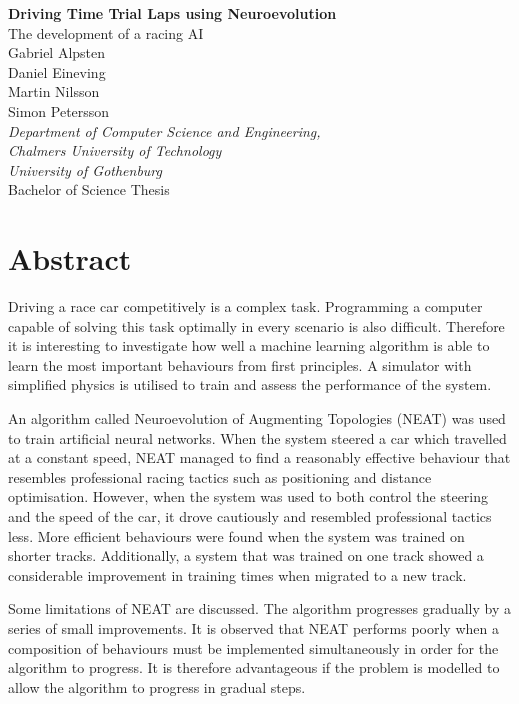 \thispagestyle{plain}			%

\noindent
{\large \textbf{Driving Time Trial Laps using Neuroevolution}}\\
{\large The development of a racing AI}\\

\noindent
{\large Gabriel Alpsten}\\
{\large Daniel Eineving}\\
{\large Martin Nilsson}\\
{\large Simon Petersson}\\
\textit{Department of Computer Science and Engineering,}\\
\textit{Chalmers University of Technology}\\
\textit{University of Gothenburg}\\

\noindent
Bachelor of Science Thesis

\section*{\centering Abstract}

Driving a race car competitively is a complex task. Programming a computer capable of solving this task optimally in every scenario is also difficult. Therefore it is interesting to investigate how well a machine learning algorithm is able to learn the most important behaviours from first principles. A simulator with simplified physics is utilised to train and assess the performance of the system.

An algorithm called Neuroevolution of Augmenting Topologies (NEAT) was used to train artificial neural networks. When the system steered a car which travelled at a constant speed, NEAT managed to find a reasonably effective behaviour that resembles professional racing tactics such as positioning and distance optimisation. However, when the system was used to both control the steering and the speed of the car, it drove cautiously and resembled professional tactics less. More efficient behaviours were found when the system was trained on shorter tracks. Additionally, a system that was trained on one track showed a considerable improvement in training times when migrated to a new track. 

Some limitations of NEAT are discussed. The algorithm progresses gradually by a series of small improvements. It is observed that NEAT performs poorly when a composition of behaviours must be implemented simultaneously in order for the algorithm to progress. It is therefore advantageous if the problem is modelled to allow the algorithm to progress in gradual steps. 

